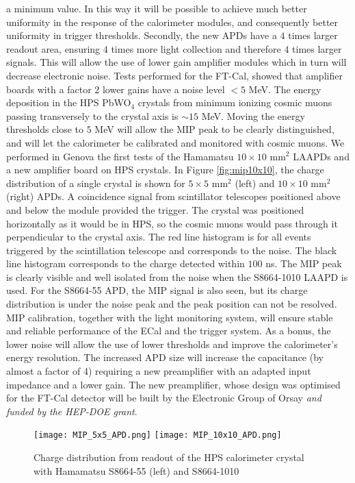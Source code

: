 \documentclass[11pt]{report}
\begin{document}
\begin{enumerate}
a minimum value. In this way it will be possible to achieve much better 
uniformity in the response of the calorimeter modules, and consequently better uniformity in trigger thresholds. 
Secondly, the new APDs have a $4$ times larger readout area, ensuring $4$ times more light collection and therefore $4$ times larger signals. 
This will allow the use of lower gain amplifier modules which in turn will decrease electronic noise. Tests 
performed for the FT-Cal, showed that amplifier boards 
with a factor 2 lower gains have a noise level $<5$ MeV. The energy deposition in the HPS PbWO$_4$ crystals  
from minimum ionizing cosmic muons passing transversely to the crystal axis is $\sim 15$ MeV. Moving the energy thresholds 
close to $5$ MeV will allow the MIP peak to be clearly distinguished, and will let the calorimeter  be calibrated and monitored with cosmic muons. 
We performed in Genova the first tests of the Hamamatsu $10\times 10$ mm$^2$ LAAPDs and a new amplifier board on HPS crystals. In 
Figure \ref{fig:mip10x10}, the charge distribution of a single crystal is shown for $5\times 5$ mm$^2$ (left) and $10\times 
10$ mm$^2$ (right) APDs. A coincidence signal from scintillator telescopes positioned above and below the module provided the trigger. 
The crystal was positioned horizontally as it would be in HPS, so the cosmic muons would pass through it perpendicular to the crystal axis. 
The red line histogram is for all events triggered by the scintillation telescope and corresponds to the noise. The black line histogram corresponds 
to the charge detected within $100$ ns. The MIP peak is clearly visible and well isolated from the noise when the S8664-1010 LAAPD 
is used. For  the S8664-55 APD, the MIP signal is also seen, but its charge distribution is under the noise peak 
and the peak position can not be resolved. MIP calibration, together with the light monitoring system, will ensure stable and reliable performance of the ECal and the trigger system. 
As a bonus, the lower noise will allow the use of lower  thresholds and improve the calorimeter's energy resolution.
The increased APD size  will increase the capacitance (by almost a factor of 4) requiring a new preamplifier with an adapted input impedance and a lower gain.
The new preamplifier, whose design was optimised for the FT-Cal detector will be built by the Electronic Group of Orsay {\it and funded by the HEP-DOE grant}.
\begin{figure*}[t]
\texttt{[image: MIP\_5x5\_APD.png]}
\texttt{[image: MIP\_10x10\_APD.png]}
\caption{\small{Charge distribution from readout of the HPS calorimeter crystal with Hamamatsu S8664-55 (left) and S8664-1010 
}}
\end{figure*}
\end{enumerate}
\end{document}
